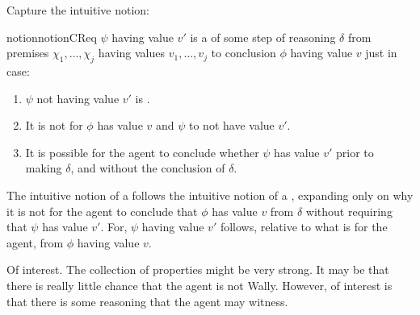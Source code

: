 \begin{note}
  Capture the intuitive notion:
  \begin{restatable}[A \crequ{}]{notion}{notionCReq}
    \(\psi\) having value \(v'\) is a \crequ{} of some step of reasoning \(\delta\) from premises \(\chi_{1},\dots,\chi_{j}\) having values \(v_{1},\dots,v_{j}\) to conclusion \(\phi\) having value \(v\) just in case:
    \begin{enumerate}[label=\arabic*., ref=(\arabic*)]
    \item
      \label{crequ:int:structure:a}
      \(\psi\) not having value \(v'\) is \epVAd{}.
    \item
      \label{crequ:int:structure:b}
      It is not \epVAd{} for \(\phi\) has value \(v\) and \(\psi\) to not have value \(v'\).
    \item
      \label{crequ:int:reasoning}
      It is possible for the agent to conclude whether \(\psi\) has value \(v'\) prior to making \(\delta\), and without the conclusion of \(\delta\).
    \end{enumerate}
  \end{restatable}

  The intuitive notion of a \crequ{} follows the intuitive notion of a \requ{}, expanding only on why it is not \epVAd{} for the agent to conclude that \(\phi\) has value \(v\) from \(\delta\) without requiring that \(\psi\) has value \(v'\).
  For, \(\psi\) having value \(v'\) follows, relative to what is \epVAd{} for the agent, from \(\phi\) having value \(v\).
\end{note}

\begin{note}
  Of interest.
  The collection of properties might be very strong.
  It may be that there is really little chance that the agent is not Wally.
  However, of interest is that there is some reasoning that the agent may witness.
\end{note}

\subparagraph{}

